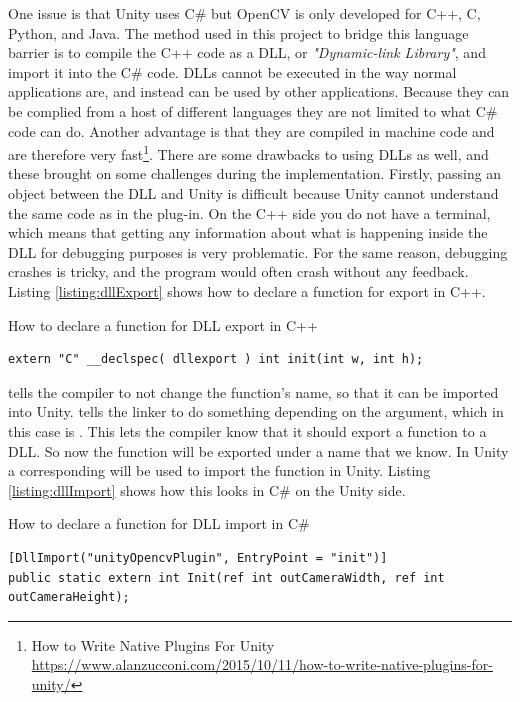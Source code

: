 		One issue is that Unity uses C\# but OpenCV is only developed for C++, C, Python, and Java. The method used in this project to bridge this language barrier is to compile the C++ code as a DLL, or \textit{"Dynamic-link Library"}, and import it into the C\# code. DLLs cannot be executed in the way normal applications are, and instead can be used by other applications. Because they can be complied from a host of different languages they are not limited to what C\# code can do. Another advantage is that they are compiled in machine code and are therefore very fast\footnote{How to Write Native Plugins For Unity \url{https://www.alanzucconi.com/2015/10/11/how-to-write-native-plugins-for-unity/}}. There are some drawbacks to using DLLs as well, and these brought on some challenges during the implementation. Firstly, passing an object between the DLL and Unity is difficult because Unity cannot understand the same code as in the plug-in. On the C++ side you do not have a terminal, which means that getting any information about what is happening inside the DLL for debugging purposes is very problematic. For the same reason, debugging crashes is tricky, and the program would often crash without any feedback. Listing \ref{listing:dllExport} shows how to declare a function for export in C++.
\begin{listing}[H]
\caption{How to declare a function for DLL export in C++}
\label{listing:dllExport}
\begin{verbatim}
extern "C" __declspec( dllexport ) int init(int w, int h);
\end{verbatim}
\end{listing}
 tells the compiler to not change the function's name, so that it can be imported into Unity.  tells the linker to do something depending on the argument, which in this case is . This lets the compiler know that it should export a function to a DLL. So now the function will be exported under a name that we know. In Unity a corresponding  will be used to import the function in Unity. Listing \ref{listing:dllImport} shows how this looks in C\# on the Unity side.
\begin{listing}[H]
	\caption{How to declare a function for DLL import in C\#}
	\label{listing:dllImport}
	\begin{verbatim}
[DllImport("unityOpencvPlugin", EntryPoint = "init")]
public static extern int Init(ref int outCameraWidth, ref int outCameraHeight);
	\end{verbatim}
\end{listing}
